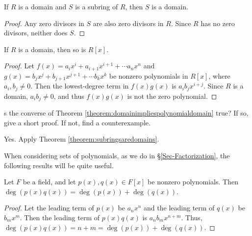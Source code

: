 \documentclass[english,course]{lecture}
\theoremstyle{plain}
\newenvironment{question}[1]
  {\renewcommand\theinnerquestion{#1}\innerquestion}
  {\endinnerquestion}
\def\presnotes{}
\begin{document}
\presnotes

\begin{theorem}\label{theorem:subringsaredomains}
	If $R$ is a domain and $S$ is a subring of $R$, then $S$ is a domain.
\end{theorem}

\begin{proof}
	Any zero divisors in $S$ are also zero divisors in $R$.
	Since $R$ has no zero divisors, neither does $S$.
\end{proof}

\presnotes


\begin{theorem}\label{theorem:domainimpliespolynomialdomain}
	If $R$ is a domain, then so is $R[x]$.
\end{theorem}

\begin{proof}
	Let $f(x) = a_i x^i + a_{i+1} x^{i+1} + \cdots a_n x^n$ and $g(x) = b_j x^j + b_{j+1} x^{j+1} +  \cdots b_k x^k$ be nonzero polynomials in $R[x]$, where $a_i, b_j \ne 0$.
	Then the lowest-degree term in $f(x) g(x)$ is $a_i b_j x^{i+j}$.
	Since $R$ is a domain, $a_i b_j\ne 0$, and thus $f(x)g(x)$ is not the zero polynomial.
\end{proof}

\presnotes


\begin{question}
	Is the converse of Theorem \ref{theorem:domainimpliespolynomialdomain} true? If so, give a short proof. If not, find a counterexample.
\end{question}

\begin{answer}
	Yes. Apply Theorem \ref{theorem:subringsaredomains}.
\end{answer}

\presnotes

When considering sets of polynomials, as we do in \S \ref{Sec-Factorization}, the following results will be quite useful.

\begin{theorem}\label{theorem:degreeofproductinfield}
	Let $F$ be a field, and let $p(x),q(x)\in F[x]$ be nonzero polynomials.
	Then $\deg(p(x) q(x)) = \deg(p(x)) + \deg(q(x))$.
\end{theorem}

\begin{proof}
	Let the leading term of $p(x)$ be $a_n x^n$ and the leading term of $q(x)$ be $b_m x^m$.
	Then the leading term of $p(x) q(x)$ is $a_n b_m x^{n+m}$.
	Thus, $\deg(p(x) q(x)) = n+m = \deg(p(x)) + \deg(q(x))$.
\end{proof}
\end{document}
